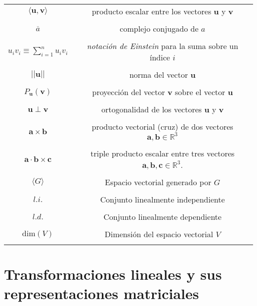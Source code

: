 \documentclass[12pt,libertine]{book}
\begin{document}
\begin{tcolorbox}
\begin{tabular}{cc}
    $\langle\mathbf{u},\mathbf{v}\rangle$ & producto escalar entre los vectores $\mathbf{u}$ y $\mathbf{v}$ \\ \\
    $\overline{a}$ & complejo conjugado de $a$ \\ \\
    $u_i v_i \equiv \sum_{i=1}^n u_i v_i$ & \textit{notación de Einstein} para la suma sobre un índice $i$ \\ \\
    $||\mathbf{u}||$ & norma del vector $\mathbf{u}$ \\ \\
    $P_{\mathbf{u}}(\mathbf{v})$ & proyección del vector $\mathbf{v}$ sobre el vector $\mathbf{u}$ \\ \\
    $\mathbf{u}\perp\mathbf{v}$ & ortogonalidad de los vectores $\mathbf{u}$ y $\mathbf{v}$ \\ \\
    $\mathbf{a}\times\mathbf{b}$ & producto vectorial (cruz) de dos vectores $\mathbf{a},\mathbf{b}\in\mathbb{R}^3$ \\ \\
    $\mathbf{a}\cdot\mathbf{b}\times\mathbf{c}$ & triple producto escalar entre tres vectores $\mathbf{a},\mathbf{b},\mathbf{c}\in\mathbb{R}^3$. \\ \\


    $\langle G \rangle $ & Espacio vectorial generado por $G$ \\ \\
    $l.i.$ & Conjunto linealmente independiente \\ \\
    $l.d.$ & Conjunto linealmente dependiente \\ \\

    $\text{dim}(V)$ & Dimensión del espacio vectorial $V$ \\ \\

\end{tabular}
\end{tcolorbox}

\newpage


\newpage


\newpage


\newpage


\newpage
\section{Transformaciones lineales y sus representaciones matriciales} \label{Sec:Transformaciones lineales y sus representaciones matriciales} 
\end{document}
